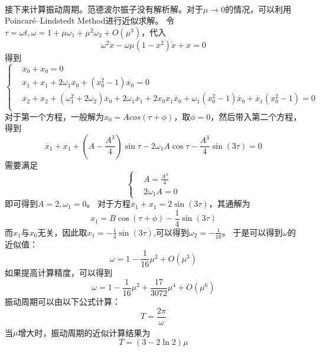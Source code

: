 \documentclass[10.5pt,oneside,a4paper]{article}
\theoremstyle{mystyle}
\begin{document}
接下来计算振动周期。范德波尔振子没有解析解\textsuperscript{\cite{https://doi.org/10.1002/zamm.200310040}}。对于$\mu \rightarrow 0$的情况，可以利用Poincaré–Lindstedt Method进行近似求解。
令$\tau=\omega t,\omega=1+\mu\omega_1+\mu^2\omega_2+O(\mu^3)$，代入
\begin{equation}
    \omega^2\ddot{x}-\omega\mu(1-x^2)\dot{x}+x=0
\end{equation}
得到
\begin{equation} 
    \left \{
    \begin{aligned}
    &\ddot{x_0}+x_0=0\\
    &\ddot{x_1}+x_1+2\omega_1\ddot{x_0}+(x_0^2-1)\dot{x_0}=0\\
    &\ddot{x_2}+x_2+(\omega_1^2+2\omega_2)\ddot{x_0}+2\omega_1\ddot{x_1}+2x_0x_1\dot{x_0}+\omega_1(x_0^2-1)\dot{x_0}+\dot{x_1}(x_0^2-1)=0\\
    \end{aligned}
    \right.
\end{equation}
对于第一个方程，一般解为$x_0=Acos(\tau+\phi)$，取$\phi=0$，然后带入第二个方程，得到
\begin{equation}
    \ddot{x_1}+x_1+(A-\frac{A^3}{4})\sin\tau-2\omega_1A\cos\tau-\frac{A^3}{4}\sin(3\tau)=0
\end{equation}
需要满足
\begin{equation} 
    \left \{
    \begin{aligned}
    &A=\frac{A^3}{4}\\
    &2\omega_1A=0
    \end{aligned}
    \right.
\end{equation}
即可得到$A=2,\omega_1=0$。
对于方程$\ddot{x_1}+x_1=2\sin(3\tau)$，其通解为
\begin{equation}
    x_1=B\cos(\tau+\phi)-\frac{1}{4}\sin(3\tau)
\end{equation}
而$x_1$与$x_0$无关，因此取$x_1=-\frac{1}{4}\sin(3\tau)$,可以得到$\omega_2=-\frac{1}{16}$。
于是可以得到$\omega$的近似值：
\begin{equation}
    \omega=1-\frac{1}{16}\mu^2+O(\mu^3)
\end{equation}
如果提高计算精度，可以得到
\begin{equation}
    \omega=1-\frac{1}{16}\mu^2+\frac{17}{3072}\mu^4+O(\mu^6)
\end{equation}
振动周期可以由以下公式计算：
\begin{equation}
    T=\frac{2\pi}{\omega}
\end{equation}
当$\mu$增大时，振动周期的近似计算结果为\textsuperscript{\cite{book}}
\begin{equation}
    T=(3-2\ln2)\mu
\end{equation}
\end{document}
